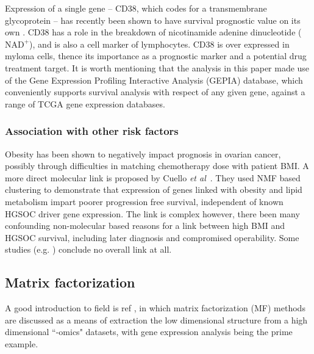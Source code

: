 \documentclass[draft, tikz, 12pt,a4paper,oneside,fleqn]{article}
\newcommand{\etal}{{\em et al\/}}
\begin{document}
Expression of a single gene -- CD38, which codes for a transmembrane glycoprotein -- has recently been shown to have survival prognostic value on its own \cite{Zhu2020}.
CD38 has a role in the breakdown of nicotinamide adenine dinucleotide ($\mbox{NAD}^+$), and is also a cell marker of lymphocytes.
CD38 is over expressed in myloma cells, thence its importance as a prognostic marker and a potential drug treatment target.  
It is worth mentioning that the analysis in this paper made use of the Gene Expression Profiling Interactive Analysis (GEPIA) database, which conveniently supports survival analysis with respect of any given gene, against a range of TCGA gene expression databases.

\subsubsection{Association with other risk factors}

Obesity has been shown to negatively impact prognosis in ovarian cancer, possibly through difficulties in matching chemotherapy dose with patient BMI.  \cite{Au-Yeung2014}  A more direct molecular link is proposed by Cuello \etal\ \cite{Cuello2018}.  They used NMF based clustering to demonstrate that expression of genes linked with obesity and lipid metabolism impart poorer progression free survival, independent of known HGSOC driver gene expression.  The link is complex however, there been many confounding non-molecular based reasons for a link between high BMI and HGSOC survival, including later diagnosis and compromised operability.  Some studies (e.g. \cite{Hew2013}) conclude no overall link at all.




\subsection{Matrix factorization}
\label{sec-matrix-factorization-intro}

A good introduction to field is ref \cite{Stein-OBrien2018}, in which matrix factorization (MF) methods are discussed as a means of extraction the low dimensional structure from a high dimensional ``-omics" datasets, with gene expression analysis being the prime example.  
\end{document}
